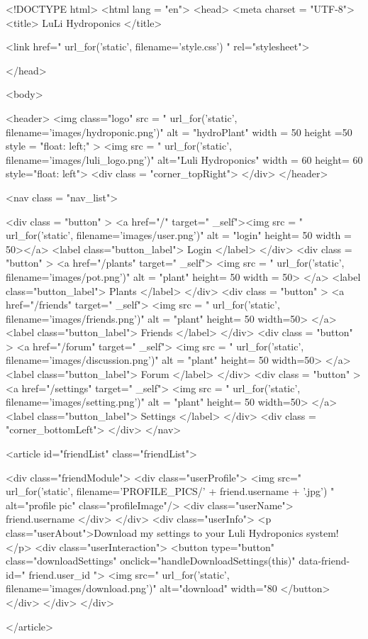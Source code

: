 \documentclass[12pt]{article} %
\begin{document}
\begin{htmlcode}[caption={Friends Page HTML}]

<!DOCTYPE html>
<html lang = "en">
<head>
<meta charset = "UTF-8">
<title> LuLi Hydroponics </title>

<link href="{{ url_for('static', filename='style.css') }}" rel="stylesheet">

</head>

<body>
 
   <header>
      <img class="logo" src = "{{ url_for('static', filename='images/hydroponic.png')}}" alt = "hydroPlant"  width = 50 height =50 style = "float: left;" >   
      <img src = "{{ url_for('static', filename='images/luli_logo.png')}}" alt="Luli Hydroponics" width = 60 height= 60 style="float: left">
      <div class = "corner_topRight"> </div>
   </header>

   <nav class = "nav_list">
      
      <div class = "button" > 
         <a href="/" target=" _self"><img src = "{{ url_for('static', filename='images/user.png')}}" alt = "login" height= 50 width = 50></a>
         <label class="button_label"> Login </label> 
      </div>
      <div class = "button" > 
         <a href="/plants" target=" _self"> <img src = "{{ url_for('static', filename='images/pot.png')}}" alt = "plant" height= 50 width = 50> </a>
         <label class="button_label"> Plants </label> 
      </div>
      <div class = "button" > 
         <a href="/friends" target=" _self"> <img src = "{{ url_for('static', filename='images/friends.png')}}" alt = "plant" height= 50 width=50> </a>
         <label class="button_label"> Friends </label> 
      </div>
      <div class = "button" > 
         <a href="/forum" target=" _self"> <img src = "{{ url_for('static', filename='images/discussion.png')}}" alt = "plant" height= 50 width=50> </a>
         <label class="button_label"> Forum </label> 
      </div>
      <div class = "button" > 
         <a href="/settings" target=" _self"> <img src = "{{ url_for('static', filename='images/setting.png')}}" alt = "plant" height= 50 width=50> </a>
         <label class="button_label"> Settings </label> 
      </div>
         <div class = "corner_bottomLeft"> </div>
     </nav>
     
     <article id="friendList" class="friendList">
      {%
      <div class="friendModule">
          <div class="userProfile">
            <img src="{{ url_for('static', filename='PROFILE_PICS/' + friend.username + '.jpg') }}" alt="profile pic" class="profileImage"/>
              <div class="userName">{{ friend.username }}</div>
          </div>
          <div class="userInfo">
              <p class="userAbout">Download my settings to your Luli Hydroponics system!</p>
              <div class="userInteraction">
                  <button type="button" class="downloadSettings" onclick="handleDownloadSettings(this)" data-friend-id="{{ friend.user_id }}">
                      <img src="{{ url_for('static', filename='images/download.png')}}" alt="download" width="80%
                  </button>
              </div>
          </div>
      </div>
      {%
  </article>

}}
\end{htmlcode}
\end{document}
